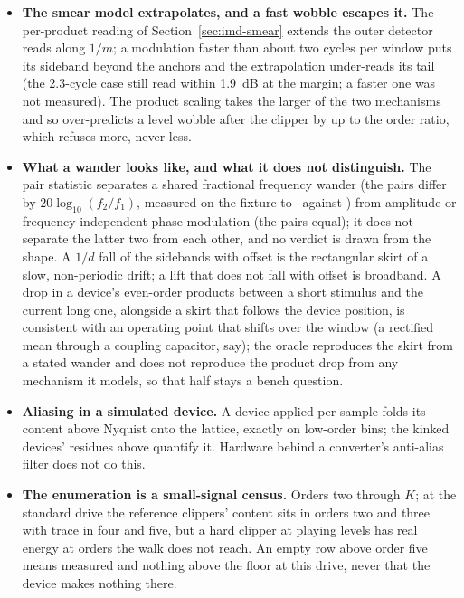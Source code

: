 \documentclass[11pt,a4paper]{article}
\begin{document}
{\begin{itemize}
  shape and the level, and the design question of whether it should say
  more when that dependence is clean is open.
  \item \textbf{The smear model extrapolates, and a fast wobble escapes
  it.} The per-product reading of Section~\ref{sec:imd-smear} extends
  the outer detector reads along $1/m$; a modulation faster than about
  two cycles per window puts its sideband beyond the anchors and the
  extrapolation under-reads its tail (the 2.3-cycle case still read
  within 1.9~dB at the margin; a faster one was not measured). The
  product scaling takes the larger of the two mechanisms and so
  over-predicts a level wobble after the clipper by up to the order
  ratio, which refuses more, never less.
  \item \textbf{What a wander looks like, and what it does not
  distinguish.} The pair statistic separates a shared fractional frequency
  wander (the pairs differ by $20\log_{10}(f_2/f_1)$, measured on the
  fixture to \iparityWanderLegacyPairDifference\ against
  \iparityWanderExpectedDifference) from amplitude or frequency-independent
  phase modulation (the pairs equal); it does not separate the latter two
  from each other, and no verdict is drawn from the shape. A $1/d$ fall
  of the sidebands with offset is the rectangular skirt of a slow,
  non-periodic drift; a lift that does not fall with offset is broadband.
  A drop in a device's even-order products between a short stimulus and
  the current long one, alongside a skirt that follows the device
  position, is consistent with an operating point that shifts over the
  window (a rectified mean through a coupling capacitor, say); the oracle
  reproduces the skirt from a stated wander and does not reproduce the
  product drop from any mechanism it models, so that half stays a bench
  question.
  \item \textbf{Aliasing in a simulated device.} A device applied per
  sample folds its content above Nyquist onto the lattice, exactly on
  low-order bins; the kinked devices' residues above quantify it. Hardware
  behind a converter's anti-alias filter does not do this.
  \item \textbf{The enumeration is a small-signal census.} Orders two
  through $K$; at the standard drive the reference clippers' content sits
  in orders two and three with trace in four and five, but a hard clipper
  at playing levels has real energy at orders the walk does not reach. An
  empty row above order five means measured and nothing above the floor at
  this drive, never that the device makes nothing there.

\end{itemize}}
\end{document}

